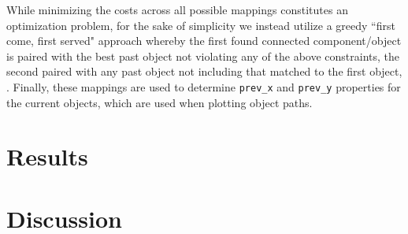 \documentclass[12pt,a4paper]{article}
\begin{document}
While minimizing the costs across all possible mappings constitutes an optimization problem, for the sake of simplicity we instead utilize a greedy ``first come, first served" approach whereby the first found connected component/object is paired with the best past object not violating any of the above constraints, the second paired with any past object not including that matched to the first object, . Finally, these mappings are used to determine \texttt{prev\_x} and \texttt{prev\_y} properties for the current objects, which are used when plotting object paths.

\section{Results}

\section{Discussion}
\end{document}
